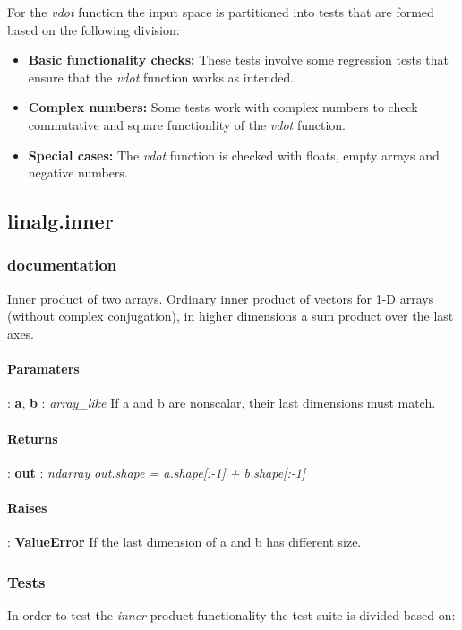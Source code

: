 \documentclass[a4paper,11pt]{article}
\begin{document}
For the \textit{vdot} function the input space is partitioned into tests that are formed based on the following division:

\begin{itemize}
	\item \textbf{Basic functionality checks:} These tests involve some regression tests that ensure that the \textit{vdot} function works as intended.
	
	\item \textbf{Complex numbers:} Some tests work with complex numbers to check commutative and square functionlity of the \textit{vdot} function.
	
	\item \textbf{Special cases:} The \textit{vdot} function is checked with floats, empty arrays and negative numbers.
\end{itemize}


\subsection{linalg.inner}
\subsubsection{documentation}
Inner product of two arrays. Ordinary inner product of vectors for 1-D arrays (without complex conjugation), in higher dimensions a sum product over the last axes.

\paragraph{Paramaters}:
\textbf{a}, \textbf{b} : \textit{array\_like} If a and b are nonscalar, their last dimensions must match.

\paragraph{Returns}: \textbf{out} : \textit{ndarray} \textit{out.shape = a.shape[:-1] + b.shape[:-1]}

\paragraph{Raises}:	
\textbf{ValueError} If the last dimension of a and b has different size.
\subsubsection{Tests}
In order to test the \textit{inner} product functionality the test suite is divided based on:
\end{document}
